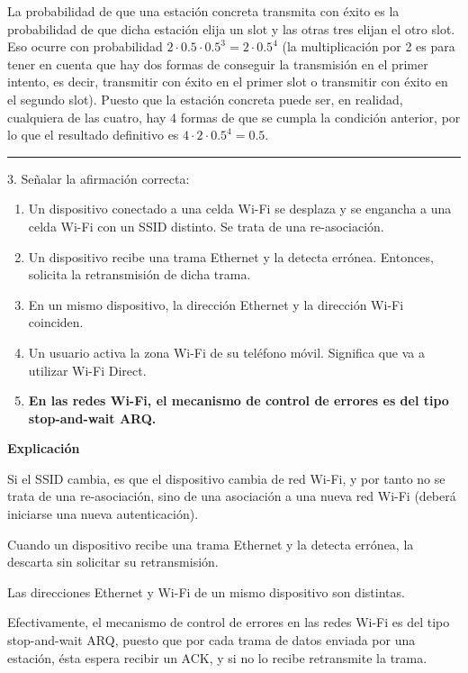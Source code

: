 \documentclass[10pt,a4paper]{article}
\begin{document}
La probabilidad de que una estación concreta transmita con éxito es la probabilidad de que dicha estación elija
un slot y las otras tres elijan el otro slot. Eso ocurre con probabilidad $2\cdot0.5\cdot0.5^3 = 2\cdot0.5^4$
(la multiplicación por 2 es para tener en cuenta que hay dos formas de conseguir la transmisión en el primer
intento, es decir, transmitir con éxito en el primer slot o transmitir con éxito en el segundo slot).
Puesto que la estación concreta puede ser, en realidad, cualquiera de las cuatro, hay 4 formas de que se cumpla
la condición anterior, por lo que el resultado definitivo es $4\cdot2\cdot0.5^4 = 0.5$.

\vspace{15pt} \hrule \vspace{15pt}




3. Señalar la afirmación correcta:

\begin{enumerate}[label=\alph*]
    \item Un dispositivo conectado a una celda Wi-Fi se desplaza y se engancha a una celda Wi-Fi con un SSID distinto. Se trata de una re-asociación.
    \item Un dispositivo recibe una trama Ethernet y la detecta errónea. Entonces, solicita la retransmisión de dicha trama.
    \item En un mismo dispositivo, la dirección Ethernet y la dirección Wi-Fi coinciden.
    \item Un usuario activa la zona Wi-Fi de su teléfono móvil. Significa que va a utilizar Wi-Fi Direct.
    \item \textbf{En las redes Wi-Fi, el mecanismo de control de errores es del tipo stop-and-wait ARQ.}
\end{enumerate}

\textbf{Explicación}

Si el SSID cambia, es que el dispositivo cambia de red Wi-Fi, y por tanto no se trata de una re-asociación, sino de una asociación a una nueva red Wi-Fi (deberá iniciarse una nueva autenticación).

Cuando un dispositivo recibe una trama Ethernet y la detecta errónea, la descarta sin solicitar su retransmisión.

Las direcciones Ethernet y Wi-Fi de un mismo dispositivo son distintas.

Efectivamente, el mecanismo de control de errores en las redes Wi-Fi es del tipo stop-and-wait ARQ, puesto que por cada trama de datos enviada por una estación, ésta espera recibir un ACK, y si no lo recibe retransmite la trama.
\end{document}

